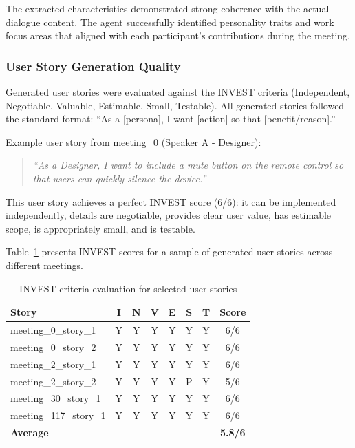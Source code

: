\documentclass[12pt]{article}
\begin{document}
The extracted characteristics demonstrated strong coherence with the actual dialogue content. The agent successfully identified personality traits and work focus areas that aligned with each participant's contributions during the meeting.

\subsubsection{User Story Generation Quality}

Generated user stories were evaluated against the INVEST criteria (Independent, Negotiable, Valuable, Estimable, Small, Testable). All generated stories followed the standard format: ``As a [persona], I want [action] so that [benefit/reason].''

Example user story from meeting\_0 (Speaker A - Designer):

\begin{quote}
\textit{``As a Designer, I want to include a mute button on the remote control so that users can quickly silence the device.''}
\end{quote}

This user story achieves a perfect INVEST score (6/6): it can be implemented independently, details are negotiable, provides clear user value, has estimable scope, is appropriately small, and is testable.

Table~\ref{tab:invest_scores} presents INVEST scores for a sample of generated user stories across different meetings.

\begin{table}[htb]
\centering
\caption{INVEST criteria evaluation for selected user stories}
\label{tab:invest_scores}
\begin{tabular}{lccccccc}
\toprule
\textbf{Story} & \textbf{I} & \textbf{N} & \textbf{V} & \textbf{E} & \textbf{S} & \textbf{T} & \textbf{Score} \\
\midrule
meeting\_0\_story\_1 & Y & Y & Y & Y & Y & Y & 6/6 \\
meeting\_0\_story\_2 & Y & Y & Y & Y & Y & Y & 6/6 \\
meeting\_2\_story\_1 & Y & Y & Y & Y & Y & Y & 6/6 \\
meeting\_2\_story\_2 & Y & Y & Y & Y & P & Y & 5/6 \\
meeting\_30\_story\_1 & Y & Y & Y & Y & Y & Y & 6/6 \\
meeting\_117\_story\_1 & Y & Y & Y & Y & Y & Y & 6/6 \\
\midrule
\textbf{Average} & \multicolumn{6}{c}{} & \textbf{5.8/6} \\
\bottomrule
\end{tabular}
\end{table}
\end{document}
